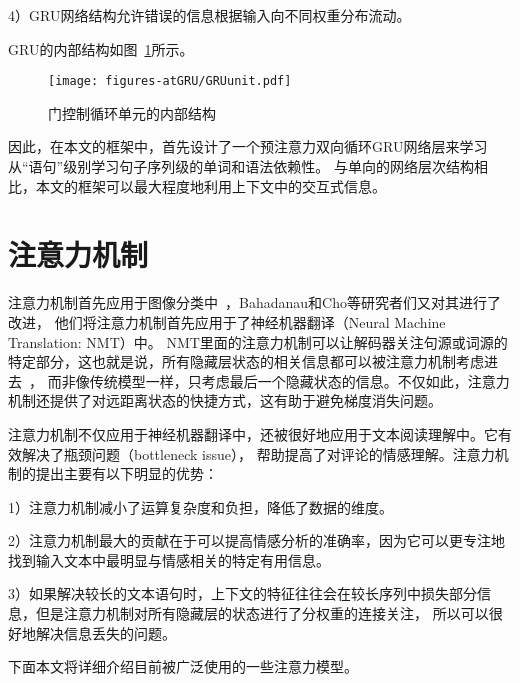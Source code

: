 4）GRU网络结构允许错误的信息根据输入向不同权重分布流动。

GRU的内部结构如图~\ref{fig:GRUunit}所示。
\begin{figure}[h!]
    \centering
    \texttt{[image: figures-atGRU/GRUunit.pdf]}
    \caption{门控制循环单元的内部结构}
    \label{fig:GRUunit}
\end{figure}

因此，在本文的框架中，首先设计了一个预注意力双向循环GRU网络层来学习从“语句”级别学习句子序列级的单词和语法依赖性。
与单向的网络层次结构相比，本文的框架可以最大程度地利用上下文中的交互式信息。

\section{注意力机制}
注意力机制首先应用于图像分类中~，Bahadanau和Cho等研究者们又对其进行了改进，
他们将注意力机制首先应用于了神经机器翻译（Neural Machine Translation: NMT）中。
NMT里面的注意力机制可以让解码器关注句源或词源的特定部分，这也就是说，所有隐藏层状态的相关信息都可以被注意力机制考虑进去~，
而非像传统模型一样，只考虑最后一个隐藏状态的信息。不仅如此，注意力机制还提供了对远距离状态的快捷方式，这有助于避免梯度消失问题。

注意力机制不仅应用于神经机器翻译中，还被很好地应用于文本阅读理解中。它有效解决了瓶颈问题（bottleneck issue），
帮助提高了对评论的情感理解。注意力机制的提出主要有以下明显的优势：

1）注意力机制减小了运算复杂度和负担，降低了数据的维度。

2）注意力机制最大的贡献在于可以提高情感分析的准确率，因为它可以更专注地找到输入文本中最明显与情感相关的特定有用信息。

3）如果解决较长的文本语句时，上下文的特征往往会在较长序列中损失部分信息，但是注意力机制对所有隐藏层的状态进行了分权重的连接关注，
所以可以很好地解决信息丢失的问题。

下面本文将详细介绍目前被广泛使用的一些注意力模型。

